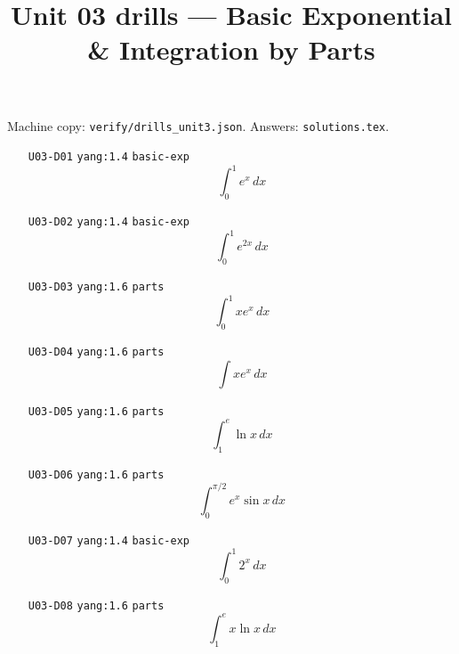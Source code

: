 
\title{Unit 03 drills --- Basic Exponential \& Integration by Parts}
\author{}
\date{}

\maketitle
\noindent Machine copy: \texttt{verify/drills\_unit3.json}. Answers: \texttt{solutions.tex}.

\begin{enumerate}
\item[\texttt{U03-D01}] \texttt{yang:1.4} \texttt{basic-exp}
\[ \int_0^1 e^x\,dx \]
\item[\texttt{U03-D02}] \texttt{yang:1.4} \texttt{basic-exp}
\[ \int_0^1 e^{2x}\,dx \]
\item[\texttt{U03-D03}] \texttt{yang:1.6} \texttt{parts}
\[ \int_0^1 x e^x\,dx \]
\item[\texttt{U03-D04}] \texttt{yang:1.6} \texttt{parts}
\[ \int x e^x\,dx \]
\item[\texttt{U03-D05}] \texttt{yang:1.6} \texttt{parts}
\[ \int_1^{e} \ln x\,dx \]
\item[\texttt{U03-D06}] \texttt{yang:1.6} \texttt{parts}
\[ \int_0^{\pi/2} e^x\sin x\,dx \]
\item[\texttt{U03-D07}] \texttt{yang:1.4} \texttt{basic-exp}
\[ \int_0^1 2^x\,dx \]
\item[\texttt{U03-D08}] \texttt{yang:1.6} \texttt{parts}
\[ \int_1^{e} x\ln x\,dx \]
\end{enumerate}

